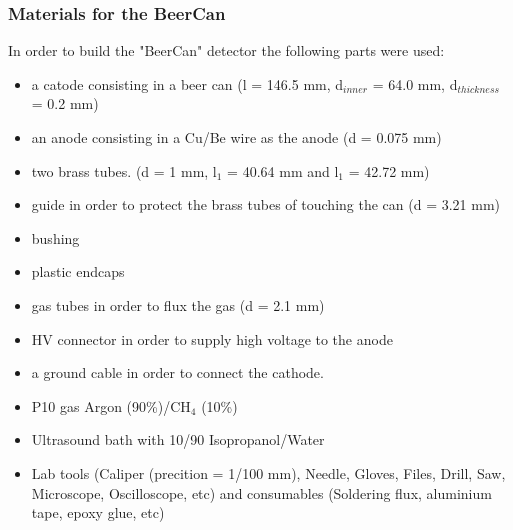 \subsubsection{Materials for the BeerCan}
\label{sec:materials_beercan}
In order to build the "BeerCan" detector the following parts were used:
\begin{itemize}
\item a catode consisting in a beer can (l = 146.5 mm, d$_{inner}$ = 64.0 mm,
  d$_{thickness}$ = 0.2 mm)
\item an anode consisting in a Cu/Be wire as the anode (d = 0.075 mm)
\item two brass tubes. (d = 1 mm, l$_{1}$ = 40.64 mm and l$_{1}$ = 42.72 mm)
\item guide in order to protect the brass tubes of touching the can (d = 3.21
  mm)
\item bushing
\item plastic endcaps
\item gas tubes in order to flux the gas (d = 2.1 mm)
\item HV connector in order to supply high voltage to the anode
\item a ground cable in order to connect the cathode.
\item P10 gas Argon (90\%)/CH$_{4}$ (10\%)
\item Ultrasound bath with 10/90 Isopropanol/Water
\item Lab tools (Caliper (precition = 1/100 mm), Needle, Gloves, Files, Drill,
  Saw, Microscope, Oscilloscope, etc) and consumables (Soldering flux, aluminium
  tape, epoxy glue, etc)
\end{itemize}

